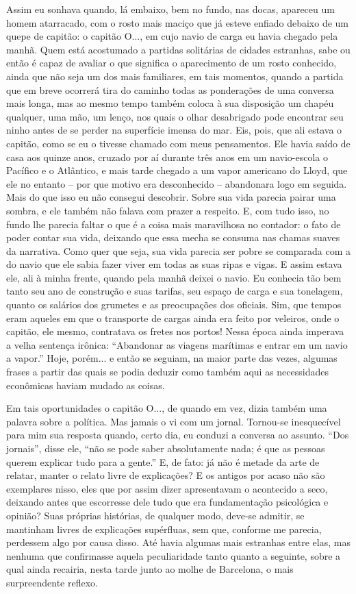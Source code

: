 Assim eu sonhava quando, lá embaixo, bem no fundo, nas docas, apareceu
um homem atarracado, com o rosto mais maciço que já esteve enfiado
debaixo de um quepe de capitão: o capitão O..., em cujo navio de carga
eu havia chegado pela manhã. Quem está acostumado a partidas solitárias
de cidades estranhas, sabe ou então é capaz de avaliar o que significa o
aparecimento de um rosto conhecido, ainda que não seja um dos mais
familiares, em tais momentos, quando a partida que em breve ocorrerá
tira do caminho todas as ponderações de uma conversa mais longa, mas ao
mesmo tempo também coloca à sua disposição um chapéu qualquer, uma mão,
um lenço, nos quais o olhar desabrigado pode encontrar seu ninho antes
de se perder na superfície imensa do mar. Eis, pois, que ali estava o
capitão, como se eu o tivesse chamado com meus pensamentos. Ele havia
saído de casa aos quinze anos, cruzado por aí durante três anos em um
navio-escola o Pacífico e o Atlântico, e mais tarde chegado a um vapor
americano do Lloyd, que ele no entanto -- por que motivo era
desconhecido -- abandonara logo em seguida. Mais do que isso eu não
consegui descobrir. Sobre sua vida parecia pairar uma sombra, e ele
também não falava com prazer a respeito. E, com tudo isso, no fundo lhe
parecia faltar o que é a coisa mais maravilhosa no contador: o fato de
poder contar sua vida, deixando que essa mecha se consuma nas chamas
suaves da narrativa. Como quer que seja, sua vida parecia ser pobre se
comparada com a do navio que ele sabia fazer viver em todas as suas
ripas e vigas. E assim estava ele, ali à minha frente, quando pela manhã
deixei o navio. Eu conhecia tão bem tanto seu ano de construção e suas
tarifas, seu espaço de carga e sua tonelagem, quanto os salários dos
grumetes e as preocupações dos oficiais. Sim, que tempos eram aqueles em
que o transporte de cargas ainda era feito por veleiros, onde o capitão,
ele mesmo, contratava os fretes nos portos! Nessa época ainda imperava a
velha sentença irônica: ``Abandonar as viagens marítimas e entrar em um
navio a vapor.'' Hoje, porém... e então se seguiam, na maior parte das
vezes, algumas frases a partir das quais se podia deduzir como também
aqui as necessidades econômicas haviam mudado as coisas.

Em tais oportunidades o capitão O..., de quando em vez, dizia também uma
palavra sobre a política. Mas jamais o vi com um jornal. Tornou-se
inesquecível para mim sua resposta quando, certo dia, eu conduzi a
conversa ao assunto. ``Dos jornais'', disse ele, ``não se pode saber
absolutamente nada; é que as pessoas querem explicar tudo para a
gente.'' E, de fato: já não é metade da arte de relatar, manter o relato
livre de explicações? E os antigos por acaso não são exemplares nisso,
eles que por assim dizer apresentavam o acontecido a seco, deixando
antes que escorresse dele tudo que era fundamentação psicológica e
opinião? Suas próprias histórias, de qualquer modo, deve-se admitir, se
mantinham livres de explicações supérfluas, sem que, conforme me
parecia, perdessem algo por causa disso. Até havia algumas mais
estranhas entre elas, mas nenhuma que confirmasse aquela peculiaridade
tanto quanto a seguinte, sobre a qual ainda recairia, nesta tarde junto
ao molhe de Barcelona, o mais surpreendente reflexo.

